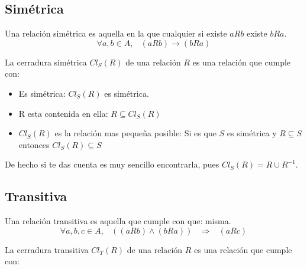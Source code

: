 \documentclass[12pt, fleqn]{report}                             %
\DeclareMathOperator \Space     {\quad}                         %
\DeclareMathOperator \MiniSpace {\;}                            %
\theoremstyle{break}                                            %
\newcommand \lInfire {\MiniSpace \Rightarrow \MiniSpace}        %
\begin{document}
            \clearpage
            \subsection{Simétrica}

                Una relación simétrica es aquella en la que cualquier si existe $aRb$ existe $bRa$.
                \begin{equation*}
                    \forall a,b \in A,\MiniSpace (aRb) \to (bRa)
                \end{equation*}


                La cerradura simétrica $Cl_S(R)$ de una relación $R$ es una relación que cumple con:

                \begin{itemize}
                    \item Es simétrica: $Cl_S(R)$ es simétrica. 
                    \item R esta contenida en ella: $R \subseteq Cl_S(R)$
                    \item $Cl_S(R)$ es la relación mas pequeña posible: 
                    Si es que $S$ es simétrica y $R \subseteq S$ entonces $Cl_S(R) \subseteq S$
                \end{itemize}

                De hecho si te das cuenta es muy sencillo encontrarla, pues
                $Cl_S(R) = R \cup R^{-1}$.



            \clearpage
            \subsection{Transitiva}

                Una relación transitiva es aquella que cumple con que:
                misma.
                \begin{equation*}
                    \forall a,b,c \in A, \MiniSpace ((aRb) \land (bRa)) \lInfire (aRc)
                \end{equation*}

                La cerradura transitiva $Cl_T(R)$ de una relación $R$ es una relación que cumple con:
\end{document}
